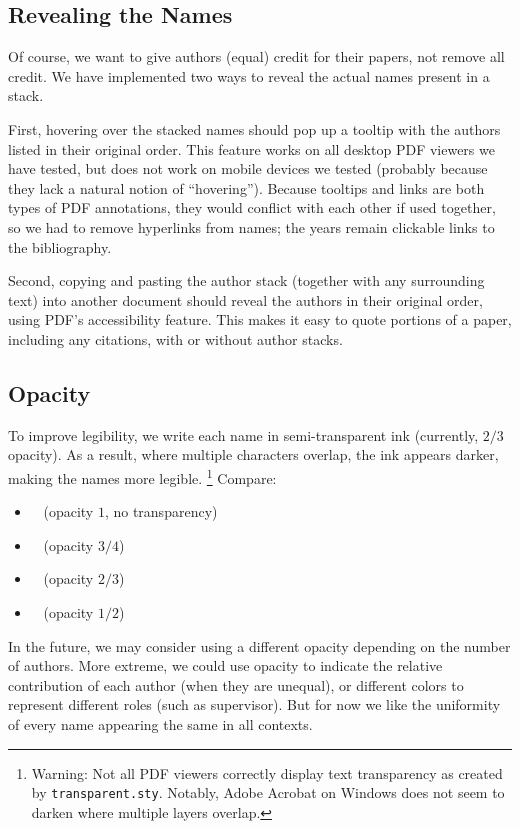 \documentclass[natbib,authoryear]{sigtbd17-style}
\begin{document}
\subsection{Revealing the Names}

Of course, we want to give authors (equal) credit for their papers,
not remove all credit.
We have implemented two ways to reveal the actual names present in a stack.

First, hovering over the stacked names should pop up a tooltip with the
authors listed in their original order.
This feature works on all desktop PDF viewers we have tested,
but does not work on mobile devices we tested
(probably because they lack a natural notion of ``hovering'').
Because tooltips and links are both types of PDF annotations, they would
conflict with each other if used together, so we had to remove hyperlinks
from names; the years remain clickable links to the bibliography.

Second, copying and pasting the author stack (together with any surrounding
text) into another document should reveal the authors in their original order,
using PDF's accessibility feature.  This makes it easy to quote portions of
a paper, including any citations, with or without author stacks.

\subsection{Opacity}

To improve legibility, we write each name in semi-transparent ink
(currently, $2/3$ opacity).
As a result, where multiple characters overlap, the ink appears darker,
making the names more legible.%
%
\footnote{Warning: Not all PDF viewers correctly display text transparency
  as created by \texttt{transparent.sty}.  Notably, Adobe Acrobat on Windows
  does not seem to darken where multiple layers overlap.}
%
Compare:
%
\begin{itemize}
\item {} ~ (opacity $1$, no transparency)
\item {} ~ (opacity $3/4$)
\item {} ~ (opacity $2/3$)
\item {} ~ (opacity $1/2$)
\end{itemize}
%
In the future, we may consider using a different opacity depending on the
number of authors.  More extreme, we could use opacity to indicate the
relative contribution of each author (when they are unequal), or different
colors to represent different roles (such as supervisor).
But for now we like the uniformity of every name
appearing the same in all contexts.
\end{document}
